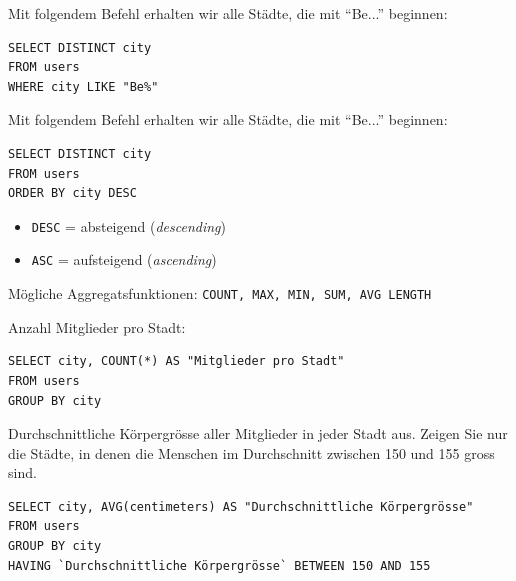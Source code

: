 \begin{landscape}
\begin{multicols*}{4}
\begin{tcolorboxTemplate}[title=Ungefähre Treffer: \texorpdfstring{\lstinline[style=sql]|LIKE|}{LIKE},colbacktitle=white, coltitle=black]
Mit folgendem Befehl erhalten wir alle Städte, die mit ``Be...'' beginnen:

\begin{lstlisting}[style=sql]
SELECT DISTINCT city 
FROM users 
WHERE city LIKE "Be%"
\end{lstlisting}
\end{tcolorboxTemplate}

\begin{tcolorboxTemplate}[title=Sortieren: \texorpdfstring{\lstinline[style=sql]|ORDER BY|}{ORDER BY},colbacktitle=white, coltitle=black]
Mit folgendem Befehl erhalten wir alle Städte, die mit ``Be...'' beginnen:
\begin{lstlisting}[style=sql]
SELECT DISTINCT city 
FROM users 
ORDER BY city DESC
\end{lstlisting}
\begin{itemize}
\item \lstinline[style=sql]|DESC| = absteigend (\textit{descending})
\item \lstinline[style=sql]|ASC| = aufsteigend (\textit{ascending})
\end{itemize}
\end{tcolorboxTemplate}

\begin{tcolorboxTemplate}[title=Aggregatsfunktionen,colbacktitle=white, coltitle=black]
Mögliche Aggregatsfunktionen: \lstinline[style=sql]|COUNT, MAX, MIN, SUM, AVG LENGTH|
\end{tcolorboxTemplate}

\begin{tcolorboxTemplate}[title=Gruppieren: \texorpdfstring{\lstinline[style=sql]|GROUP BY|}{GROUP BY},colbacktitle=white, coltitle=black]
Anzahl Mitglieder pro Stadt:
\begin{lstlisting}[style=sql]
SELECT city, COUNT(*) AS "Mitglieder pro Stadt" 
FROM users 
GROUP BY city
\end{lstlisting}
\end{tcolorboxTemplate}

\begin{tcolorboxTemplate}[title=Filtern nach Gruppieren: \texorpdfstring{\lstinline[style=sql]|HAVING|}{HAVING},colbacktitle=white, coltitle=black]
Durchschnittliche Körpergrösse aller Mitglieder in jeder Stadt aus. Zeigen Sie nur die Städte, in denen die Menschen im Durchschnitt zwischen 150 und 155 gross sind.
\begin{lstlisting}[style=sql]
SELECT city, AVG(centimeters) AS "Durchschnittliche Körpergrösse"
FROM users
GROUP BY city
HAVING `Durchschnittliche Körpergrösse` BETWEEN 150 AND 155
\end{lstlisting}
\end{tcolorboxTemplate}


\end{multicols*}
\end{landscape}
